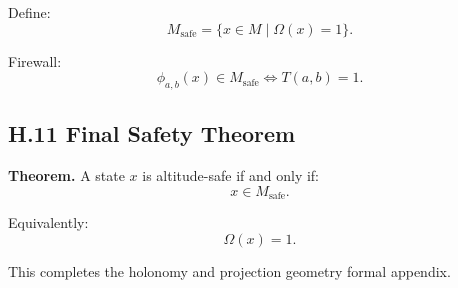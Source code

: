 Define:
\[
M_{\mathrm{safe}} = \{ x \in M \mid \Omega(x)=1 \}.
\]

Firewall:
\[
\phi_{a,b}(x) \in M_{\mathrm{safe}}
\iff
T(a,b)=1.
\]

\subsection*{H.11 Final Safety Theorem}

\textbf{Theorem.}  
A state $x$ is altitude-safe if and only if:
\[
x \in M_{\mathrm{safe}}.
\]

Equivalently:
\[
\Omega(x)=1.
\]

This completes the holonomy and projection geometry formal appendix.
